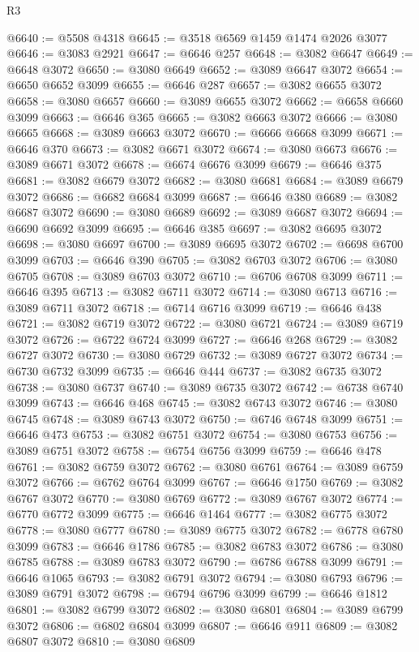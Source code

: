 \begin{lexlean}{R3}
\begin{coremodule}
@6640 := @5508 @4318
@6645 := @3518 @6569 @1459 @1474 @2026 @3077
@6646 := @3083 @2921
@6647 := @6646 @257
@6648 := @3082 @6647
@6649 := @6648 @3072
@6650 := @3080 @6649
@6652 := @3089 @6647 @3072
@6654 := @6650 @6652 @3099
@6655 := @6646 @287
@6657 := @3082 @6655 @3072
@6658 := @3080 @6657
@6660 := @3089 @6655 @3072
@6662 := @6658 @6660 @3099
@6663 := @6646 @365
@6665 := @3082 @6663 @3072
@6666 := @3080 @6665
@6668 := @3089 @6663 @3072
@6670 := @6666 @6668 @3099
@6671 := @6646 @370
@6673 := @3082 @6671 @3072
@6674 := @3080 @6673
@6676 := @3089 @6671 @3072
@6678 := @6674 @6676 @3099
@6679 := @6646 @375
@6681 := @3082 @6679 @3072
@6682 := @3080 @6681
@6684 := @3089 @6679 @3072
@6686 := @6682 @6684 @3099
@6687 := @6646 @380
@6689 := @3082 @6687 @3072
@6690 := @3080 @6689
@6692 := @3089 @6687 @3072
@6694 := @6690 @6692 @3099
@6695 := @6646 @385
@6697 := @3082 @6695 @3072
@6698 := @3080 @6697
@6700 := @3089 @6695 @3072
@6702 := @6698 @6700 @3099
@6703 := @6646 @390
@6705 := @3082 @6703 @3072
@6706 := @3080 @6705
@6708 := @3089 @6703 @3072
@6710 := @6706 @6708 @3099
@6711 := @6646 @395
@6713 := @3082 @6711 @3072
@6714 := @3080 @6713
@6716 := @3089 @6711 @3072
@6718 := @6714 @6716 @3099
@6719 := @6646 @438
@6721 := @3082 @6719 @3072
@6722 := @3080 @6721
@6724 := @3089 @6719 @3072
@6726 := @6722 @6724 @3099
@6727 := @6646 @268
@6729 := @3082 @6727 @3072
@6730 := @3080 @6729
@6732 := @3089 @6727 @3072
@6734 := @6730 @6732 @3099
@6735 := @6646 @444
@6737 := @3082 @6735 @3072
@6738 := @3080 @6737
@6740 := @3089 @6735 @3072
@6742 := @6738 @6740 @3099
@6743 := @6646 @468
@6745 := @3082 @6743 @3072
@6746 := @3080 @6745
@6748 := @3089 @6743 @3072
@6750 := @6746 @6748 @3099
@6751 := @6646 @473
@6753 := @3082 @6751 @3072
@6754 := @3080 @6753
@6756 := @3089 @6751 @3072
@6758 := @6754 @6756 @3099
@6759 := @6646 @478
@6761 := @3082 @6759 @3072
@6762 := @3080 @6761
@6764 := @3089 @6759 @3072
@6766 := @6762 @6764 @3099
@6767 := @6646 @1750
@6769 := @3082 @6767 @3072
@6770 := @3080 @6769
@6772 := @3089 @6767 @3072
@6774 := @6770 @6772 @3099
@6775 := @6646 @1464
@6777 := @3082 @6775 @3072
@6778 := @3080 @6777
@6780 := @3089 @6775 @3072
@6782 := @6778 @6780 @3099
@6783 := @6646 @1786
@6785 := @3082 @6783 @3072
@6786 := @3080 @6785
@6788 := @3089 @6783 @3072
@6790 := @6786 @6788 @3099
@6791 := @6646 @1065
@6793 := @3082 @6791 @3072
@6794 := @3080 @6793
@6796 := @3089 @6791 @3072
@6798 := @6794 @6796 @3099
@6799 := @6646 @1812
@6801 := @3082 @6799 @3072
@6802 := @3080 @6801
@6804 := @3089 @6799 @3072
@6806 := @6802 @6804 @3099
@6807 := @6646 @911
@6809 := @3082 @6807 @3072
@6810 := @3080 @6809

\end{coremodule}
\end{lexlean}
